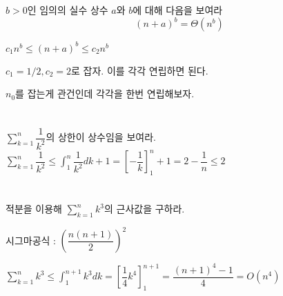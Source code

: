 \documentclass{oblivoir}
\begin{document}
\section{} 
$b>0$인 임의의 실수 상수 $a$와 $b$에 대해 다음을 보여라
$$(n+a)^b = \Theta(n^b)$$

$c_1n^b \le (n+a)^b \le c_2n^b$

$c_1 = 1/2, c_2 = 2$로 잡자.
이를 각각 연립하면 된다.

$n_0$를 잡는게 관건인데 각각을 한번 연립해보자.

\section{} 
$\displaystyle\sum_{k=1}^n \dfrac{1}{k^2}$의 상한이 상수임을 보여라.
$\sum_{k=1}^n \dfrac{1}{k^2} \le \int_{1}^{n} \dfrac{1}{k^2} dk + 1 = \left[-\dfrac{1}{k}\right]^{n}_{1} + 1 = 2 - \dfrac{1}{n} \le 2$




\section{} 
적분을 이용해 $\displaystyle\sum_{k=1}^n k^3$의 근사값을 구하라.

시그마공식 : $\left( \dfrac{n(n+1)}{2} \right)^2$


$\sum_{k=1}^n k^3 \le \int_{1}^{n+1}  k^3 dk = \left[\dfrac{1}{4} k^4\right]^{n+1}_{1} = \dfrac{(n+1)^4 - 1}{4} = O(n^4)$
\end{document}
